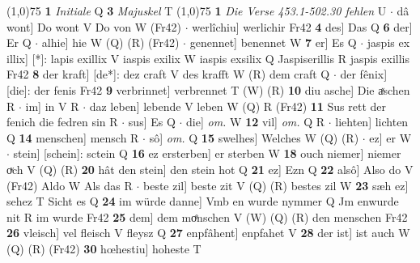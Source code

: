 \documentclass[8pt,a4paper,notitlepage]{article}
\begin{document}
\begin{table}[ht]
\begin{minipage}[t]{0.5\linewidth}
\line(1,0){75} \newline
\textbf{1} \textit{Initiale} Q  \textbf{3} \textit{Majuskel} T  \newline
\line(1,0){75} \newline
\textbf{1} \textit{Die Verse 453.1-502.30 fehlen} U   $\cdot$ dâ wont] Do wont V Do von W (Fr42)  $\cdot$ werlîchiu] werlichir Fr42 \textbf{4} des] Das Q \textbf{6} der] Er Q  $\cdot$ alhie] hie W (Q) (R) (Fr42)  $\cdot$ genennet] benennet W \textbf{7} er] Es Q  $\cdot$ jaspis ex illix] [*]: lapis exillix V iaspis exilix W iaspis exsilix Q Jaspiserillis R jaspis exillis Fr42 \textbf{8} der kraft] [de*]: dez craft V des krafft W (R) dem craft Q  $\cdot$ der fênix] [die]: der fenis Fr42 \textbf{9} verbrinnet] verbrennet T (W) (R) \textbf{10} diu asche] Die aͯschen R  $\cdot$ im] in V R  $\cdot$ daz leben] lebende V leben W (Q) R (Fr42) \textbf{11} Sus rett der fenich die fedren sin R  $\cdot$ sus] Es Q  $\cdot$ die] \textit{om.} W \textbf{12} vil] \textit{om.} Q R  $\cdot$ liehten] lichten Q \textbf{14} menschen] mensch R  $\cdot$ sô] \textit{om.} Q \textbf{15} swelhes] Welches W (Q) (R)  $\cdot$ ez] er W  $\cdot$ stein] [schein]: sctein Q \textbf{16} ez ersterben] er sterben W \textbf{18} ouch niemer] niemer oͮch V (Q) (R) \textbf{20} hât den stein] den stein hot Q \textbf{21} ez] Ezn Q \textbf{22} alsô] Also do V (Fr42) Aldo W Als das R  $\cdot$ beste zil] beste zit V (Q) (R) bestes zil W \textbf{23} sæh ez] sehez T Sicht es Q \textbf{24} im würde danne] Vmb en wurde nymmer Q Jm enwurde nit R im wurde Fr42 \textbf{25} dem] dem moͤnschen V (W) (Q) (R) den menschen Fr42 \textbf{26} vleisch] vel fleisch V fleysz Q \textbf{27} enpfâhent] enpfahet V \textbf{28} der ist] ist auch W (Q) (R) (Fr42) \textbf{30} hœhestiu] hoheste T \newline
\end{minipage}
\end{table}
\end{document}

